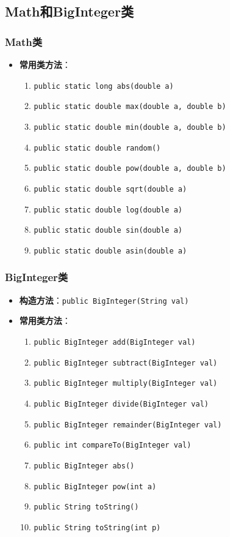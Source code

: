 \documentclass[a4paper, 10pt]{ctexart}
\begin{document}
\subsection{Math和BigInteger类}
\subsubsection{Math类}
\begin{itemize}
  \item \textbf{常用类方法}：
  \begin{enumerate}
    \item \texttt{public static long abs(double a)}
    \item \texttt{public static double max(double a, double b)}
    \item \texttt{public static double min(double a, double b)}
    \item \texttt{public static double random()}
    \item \texttt{public static double pow(double a, double b)}
    \item \texttt{public static double sqrt(double a)}
    \item \texttt{public static double log(double a)}
    \item \texttt{public static double sin(double a)}
    \item \texttt{public static double asin(double a)}
  \end{enumerate}
\end{itemize}

\subsubsection{BigInteger类}
\begin{itemize}
  \item \textbf{构造方法}：\texttt{public BigInteger(String val)}
  \item \textbf{常用类方法}：
  \begin{enumerate}
    \item \texttt{public BigInteger add(BigInteger val)}
    \item \texttt{public BigInteger subtract(BigInteger val)}
    \item \texttt{public BigInteger multiply(BigInteger val)}
    \item \texttt{public BigInteger divide(BigInteger val)}
    \item \texttt{public BigInteger remainder(BigInteger val)}
    \item \texttt{public int compareTo(BigInteger val)}
    \item \texttt{public BigInteger abs()}
    \item \texttt{public BigInteger pow(int a)}
    \item \texttt{public String toString()}
    \item \texttt{public String toString(int p)}
  \end{enumerate}
\end{itemize}
\end{document}
